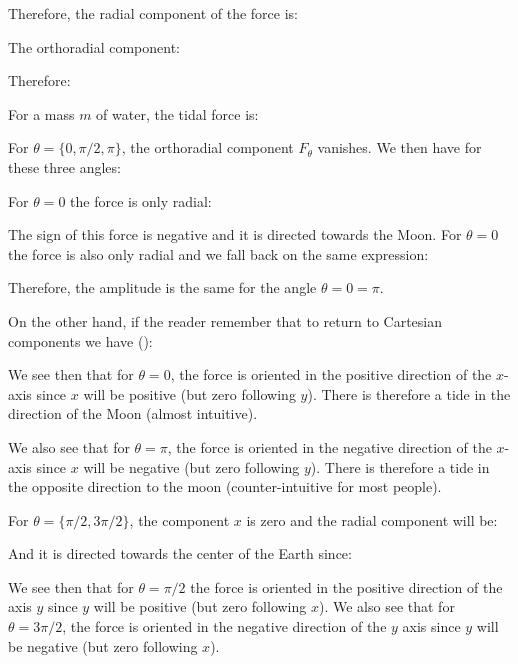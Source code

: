 	Therefore, the radial component of the force is:
	
	The orthoradial component:
	
	Therefore:
	
	For a mass $m$ of water, the tidal force is:
	
	For $\theta=\{0,\pi/2,\pi\}$, the orthoradial component $F_\theta$ vanishes. We then have for these three angles:
	
	For $\theta=0$ the force is only radial:
	
	The sign of this force is negative and it is directed towards the Moon. For $\theta=0$ the force is also only radial and we fall back on the same expression:
	
	Therefore, the amplitude is the same for the angle $\theta=0=\pi$.
	
	On the other hand, if the reader remember that to return to Cartesian components we have ():
	
	We see then that for $\theta=0$, the force is oriented in the positive direction of the $x$-axis since $x$ will be positive (but zero following $y$). There is therefore a tide in the direction of the Moon (almost intuitive).

	We also see that for $\theta=\pi$, the force is oriented in the negative direction of the $x$-axis since $x$ will be negative (but zero following $y$). There is therefore a tide in the opposite direction to the moon (counter-intuitive for most people).

	For $\theta=\{\pi/2,3\pi/2\}$, the component $x$ is zero and the radial component will be:
	
	And it is directed towards the center of the Earth since:
	
	We see then that for $\theta=\pi/2$ the force is oriented in the positive direction of the axis $y$ since $y$ will be positive (but zero following $x$). We also see that for $\theta=3\pi/2$, the force is oriented in the negative direction of the $y$ axis since $y$ will be negative (but zero following $x$).

